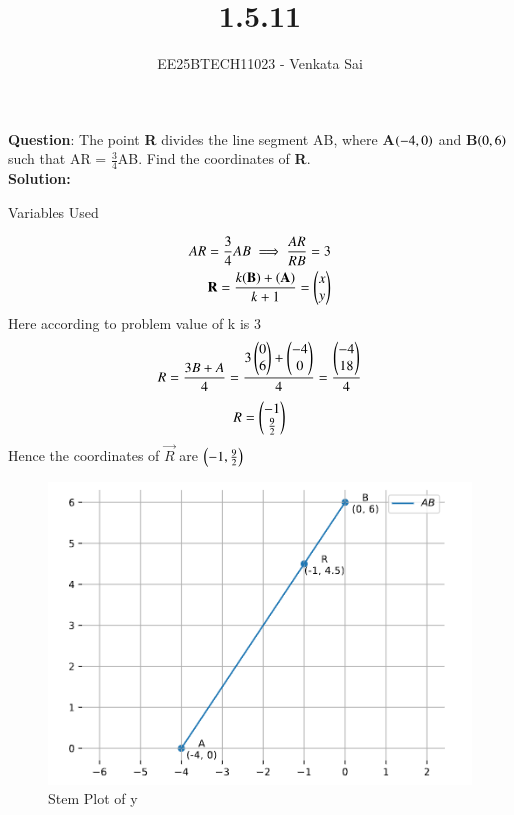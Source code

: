 \documentclass[journal]{IEEEtran}
\begin{document}


\title{1.5.11}
\author{EE25BTECH11023 - Venkata Sai}
{\let\newpage\relax\maketitle}

\renewcommand{\thefigure}{\theenumi}
\renewcommand{\thetable}{\theenumi}
\setlength{\intextsep}{10pt} %


\renewcommand{\thetable}{\theenumi}


\textbf{Question}:\newline
The point \textbf{R} divides the line segment AB, where \textbf{A}$\left(-4,0\right)$ and \textbf{B}$\left(0,6\right)$ such that
AR = $\frac{3}{4}$AB. Find the coordinates of \textbf{R}. 
\\
\textbf{Solution: }
\begin{table}[h!]    
  \centering
  
  \caption{Variables Used}
\end{table}
\begin{align}
AR=\frac{3}{4}AB \implies \frac{AR}{RB}=3\\
\mathbf{R}=\frac{k(\mathbf{B})+(\mathbf{A})}{k+1}=\begin{pmatrix}x\\y\end{pmatrix}\\
\end{align}
Here according to problem value of k is 3\\
\begin{align}
R=\frac{3B+A}{4}=\frac{3\begin{pmatrix}0\\6\end{pmatrix}+\begin{pmatrix}-4\\0\end{pmatrix}}{4}=\frac{\begin{pmatrix}-4\\18\end{pmatrix}}{4}\\
\end{align}
\begin{align}
R=\begin{pmatrix}-1\\\frac{9}{2}\end{pmatrix}
\end{align}
Hence the coordinates of $\vec{R}$ are $\left(-1,\frac{9}{2}\right)$
\begin{figure}[h!]
   \centering
   \includegraphics[width=0.7\linewidth]{figs/Fig1.png}
   \caption{Stem Plot of y}
   \label{stemplot}
\end{figure}
\end{document}

